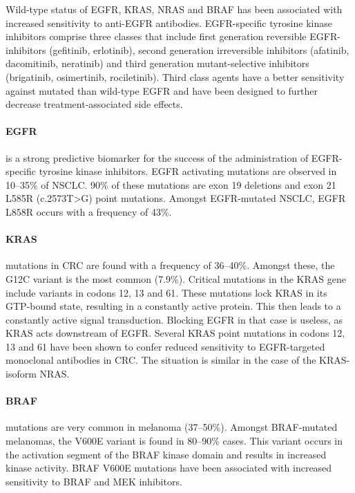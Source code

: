       Wild-type status of EGFR, KRAS, NRAS and BRAF has been associated with
      increased sensitivity to anti-EGFR antibodies. EGFR-specific tyrosine
      kinase inhibitors comprise three classes that include first generation
      reversible  EGFR-inhibitors (gefitinib, erlotinib), second generation
      irreversible inhibitors (afatinib, dacomitinib, neratinib) and third
      generation mutant-selective inhibitors (brigatinib, osimertinib,
      rociletinib). Third class agents have a better sensitivity against mutated
      than wild-type EGFR and have been designed to further decrease
      treatment-associated side effects.
      \paragraph{EGFR} is a strong predictive biomarker for the success of the
      administration of EGFR-specific tyrosine kinase inhibitors.
      EGFR activating mutations are observed in 10--35\% of NSCLC.
      90\% of these mutations are exon 19 deletions and exon 21 L585R (c.2573T>G)
      point mutations. Amongst EGFR-mutated NSCLC, EGFR L858R occurs with a
      frequency of 43\%.
      \paragraph{KRAS} mutations in CRC are found with a frequency of 36--40\%. Amongst
      these, the G12C variant is the most common (7.9\%). Critical mutations
      in the KRAS gene include variants in codons 12, 13 and 61. These mutations
      lock KRAS in its GTP-bound state, resulting in a constantly active protein.
      This then leads to a constantly active signal transduction. Blocking
      EGFR in that case is useless, as KRAS acts downstream of EGFR. Several
      KRAS point mutations in codons 12, 13 and 61 have been shown to confer
      reduced sensitivity to EGFR-targeted monoclonal antibodies in CRC. The
      situation is similar in the case of the KRAS-isoform NRAS.
      \paragraph{BRAF} mutations are very common in melanoma (37--50\%). Amongst
      BRAF-mutated melanomas, the V600E variant is found in 80--90\% cases.
      This variant occurs in the activation segment of the BRAF kinase domain
      and results in increased kinase activity. BRAF V600E mutations
      have been associated with increased sensitivity to BRAF and MEK inhibitors.


